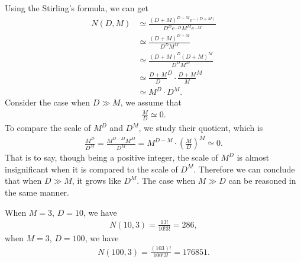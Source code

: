 \begin{answer}{}
	Using the Stirling's formula, we can get
	\begin{align}
		N(D, M)  &\simeq \frac{(D + M)^{D + M}e^{-(D + M)}}{D^De^{-D}M^Me^{-M}}\\
		& \simeq \frac{(D + M)^{D + M}}{D^D M^M}\\
		& \simeq \frac{(D + M)^D (D + M)^M}{D^D M^M}\\
		& \simeq \frac{D + M}{D}^D \cdot \frac{D + M}{M}^M\\
		& \simeq M^D \cdot D^M.
	\end{align}
	Consider the case when $D \gg M$, we assume that
	\begin{align}
		\frac{M}{D} \simeq 0.
	\end{align}
	To compare the scale of $M^D$ and $D^M$, we study their quotient, which is
	\begin{align}
		\frac{M^D}{D^M} = \frac{M^{D - M}M^M}{D^M} = M^{D-M} \cdot \left(\frac{M}{D}\right)^M \simeq 0.
	\end{align}
	That is to say, though being a positive integer, the scale of $M^D$ is almost insignificant when it is compared to the scale of $D^M$. Therefore we can conclude that when $D \gg M$, it grows like $D^M$. The case when $M \gg D$ can be reasoned in the same manner.
	
	When $M = 3$, $D = 10$, we have
	\begin{align}
		N(10, 3) = \frac{13!}{10!3!} = 286,
	\end{align}
	when $M = 3$, $D = 100$, we have
	\begin{align}
		N(100, 3) = \frac{(103)!}{100!3!} = 176851.
	\end{align}
\end{answer}